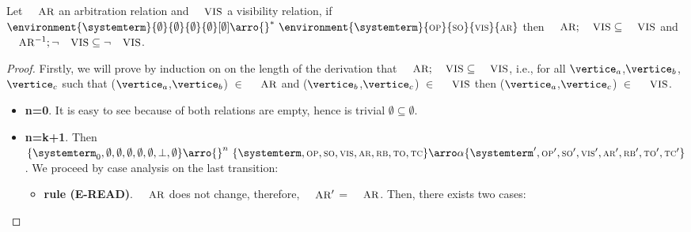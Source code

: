 \begin{theorem}

Let $\textsc{\small{AR}}$ an arbitration relation and $\textsc{\small{VIS}}$ a visibility relation, if $\environment{\systemterm}{\emptyset}{\emptyset}{\emptyset}{\emptyset}[\emptyset] \arro{} ^*\ \environment{\systemterm}{\op}{\so}{\vis}{\arb} $ then $\textsc{\small{AR}};\textsc{\small{VIS}} \subseteq \textsc{\small{VIS}}$ and  $\textsc{\small{AR}}^{-1};\neg\textsc{\small{VIS}} \subseteq \neg\textsc{\small{VIS}}$.


\end{theorem}
 

\begin{proof} 
Firstly, we will prove by induction on on the length of the derivation that $\textsc{\small{AR}};\textsc{\small{VIS}} \subseteq \textsc{\small{VIS}}$, i.e., for all $\vertice_a$,$\vertice_b$,$\vertice_c$ such that ($\vertice_a$,$\vertice_b$) $\in$ $\textsc{\small{AR}}$ and ($\vertice_b$,$\vertice_c$) $\in$ $\textsc{\small{VIS}}$ then ($\vertice_a$,$\vertice_c$) $\in$ $\textsc{\small{VIS}}$.

\begin{itemize}
   \item{\bf n=0}. It is easy to see because of both relations are empty, hence is trivial $\emptyset \subseteq \emptyset$.
   \item{\bf n=k+1}. Then $\environmenttran{\systemterm_0}{\emptyset}{\emptyset}{\emptyset}{\emptyset}{\emptyset}{\undefined}{\emptyset} \arro{} ^n\ \environmenttran{\systemterm}{\op}{\so}{\vis}{\arb}{\rb}{\tx}{\tc} \arroi{\alpha} \environmenttran{\systemterm'}{\op'}{\so'}{\vis'}{\arb'}{\rb'}{\tx'}{\tc'}$. We proceed by case analysis on the last transition:
	
	\begin{itemize}
        \item {\bf rule (\textsc{E-READ})}. $\textsc{\small{AR}}$ does not change, therefore, $\textsc{\small{AR}}'$ = $\textsc{\small{AR}}$.  Then, there exists two cases: 
				

\end{itemize}
\end{itemize}
\end{proof}
